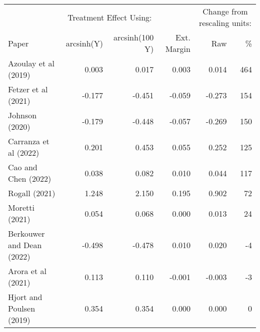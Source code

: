 \begin{tabular}{lrrrrr}
\toprule
 & \multicolumn{2}{c}{Treatment Effect Using:} &  & \multicolumn{2}{c}{Change from rescaling units:} \\ 
\cmidrule(lr){2-3} \cmidrule(lr){5-6}
Paper & arcsinh(Y) & arcsinh(100 Y) & Ext. Margin & Raw & \% \\ 
\midrule\addlinespace[2.5pt]
Azoulay et al (2019) & 0.003 & 0.017 & 0.003 & 0.014 & 464 \\ 
Fetzer et al (2021) & -0.177 & -0.451 & -0.059 & -0.273 & 154 \\ 
Johnson (2020) & -0.179 & -0.448 & -0.057 & -0.269 & 150 \\ 
Carranza et al (2022) & 0.201 & 0.453 & 0.055 & 0.252 & 125 \\ 
Cao and Chen (2022) & 0.038 & 0.082 & 0.010 & 0.044 & 117 \\ 
Rogall (2021) & 1.248 & 2.150 & 0.195 & 0.902 & 72 \\ 
Moretti (2021) & 0.054 & 0.068 & 0.000 & 0.013 & 24 \\ 
Berkouwer and Dean (2022) & -0.498 & -0.478 & 0.010 & 0.020 & -4 \\ 
Arora et al (2021) & 0.113 & 0.110 & -0.001 & -0.003 & -3 \\ 
Hjort and Poulsen (2019) & 0.354 & 0.354 & 0.000 & 0.000 & 0 \\ 
\bottomrule
\end{tabular}
